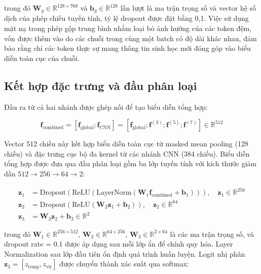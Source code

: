 \noindent trong đó $\mathbf{W}_g \in \mathbb{R}^{128 \times 768}$ và $\mathbf{b}_g \in \mathbb{R}^{128}$ lần lượt là ma trận trọng số và vector hệ số dịch của phép chiếu tuyến tính, tỷ lệ dropout được đặt bằng 0{,}1. Việc sử dụng mặt nạ trong phép gộp trung bình nhằm loại bỏ ảnh hưởng của các token đệm, vốn được thêm vào do các chuỗi trong cùng một batch có độ dài khác nhau, đảm bảo rằng chỉ các token thực sự mang thông tin sinh học mới đóng góp vào biểu diễn toàn cục của chuỗi.

\subsection{Kết hợp đặc trưng và đầu phân loại}

Đầu ra từ cả hai nhánh được ghép nối để tạo biểu diễn tổng hợp:

\begin{equation}
    \mathbf{f}_{\text{combined}} = [\mathbf{f}_{\text{global}}; \mathbf{f}_{\text{CNN}}] = [\mathbf{f}_{\text{global}}; \mathbf{f}^{(3)}; \mathbf{f}^{(5)}; \mathbf{f}^{(7)}] \in \mathbb{R}^{512}
    \label{eq:feature_fusion}
\end{equation}

Vector 512 chiều này kết hợp biểu diễn toàn cục từ masked mean pooling (128 chiều) và đặc trưng cục bộ đa kernel từ các nhánh CNN (384 chiều). Biểu diễn tổng hợp được đưa qua đầu phân loại gồm ba lớp tuyến tính với kích thước giảm dần $512 \to 256 \to 64 \to 2$:

\begin{align}
    \mathbf{z}_1 &= \text{Dropout}(\text{ReLU}(\text{LayerNorm}(\mathbf{W}_1 \mathbf{f}_{\text{combined}} + \mathbf{b}_1))), \quad \mathbf{z}_1 \in \mathbb{R}^{256} \label{eq:cls_layer1} \\
    \mathbf{z}_2 &= \text{Dropout}(\text{ReLU}(\mathbf{W}_2 \mathbf{z}_1 + \mathbf{b}_2)), \quad \mathbf{z}_2 \in \mathbb{R}^{64} \label{eq:cls_layer2} \\
    \mathbf{z}_3 &= \mathbf{W}_3 \mathbf{z}_2 + \mathbf{b}_3 \in \mathbb{R}^{2} \label{eq:cls_output}
\end{align}

trong đó $\mathbf{W}_1 \in \mathbb{R}^{256 \times 512}$, $\mathbf{W}_2 \in \mathbb{R}^{64 \times 256}$, $\mathbf{W}_3 \in \mathbb{R}^{2 \times 64}$ là các ma trận trọng số, và dropout rate = 0.1 được áp dụng sau mỗi lớp ẩn để chính quy hóa. Layer Normalization sau lớp đầu tiên ổn định quá trình huấn luyện. Logit nhị phân $\mathbf{z}_3 = [z_{\text{temp}}, z_{\text{vir}}]$ được chuyển thành xác suất qua softmax:

